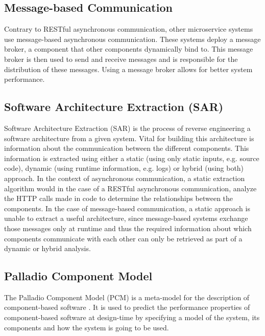 \subsection{Message-based Communication}
\label{sec:Foundation:MessageBasedCommunication}
Contrary to RESTful asynchronous communication, other microservice systems use message-based asynchronous communication.
These systems deploy a message broker, a component that other components dynamically bind to.
This message broker is then used to send and receive messages and is responsible for the distribution of these messages.
Using a message broker allows for better system performance. \cite{Singh2021}

\subsection{Software Architecture Extraction (SAR)}
\label{sec:Foundation:SAR}
Software Architecture Extraction (SAR) is the process of reverse engineering a software architecture from a given system.
Vital for building this architecture is information about the communication between the different components.
This information is extracted using either a static (using only static inputs, e.g. source code), dynamic (using runtime information, e.g. logs) or hybrid (using both) approach.
In the context of asynchronous communication, a static extraction algorithm would in the case of a RESTful asynchronous communication, analyze the HTTP calls made in code to determine the relationships between the components.
In the case of message-based communication, a static approach is unable to extract a useful architecture, since message-based systems exchange those messages only at runtime and thus the required information about which components communicate with each other can only be retrieved as part of a dynamic or hybrid analysis. \cite{Singh2021,Mayer2018}

\subsection{Palladio Component Model}
\label{sec:Foundation:PCM}
The Palladio Component Model (PCM) is a meta-model for the description of component-based software \cite{Becker2008}.
It is used to predict the performance properties of component-based software at design-time by specifying a model of the system, its components and how the system is going to be used. 